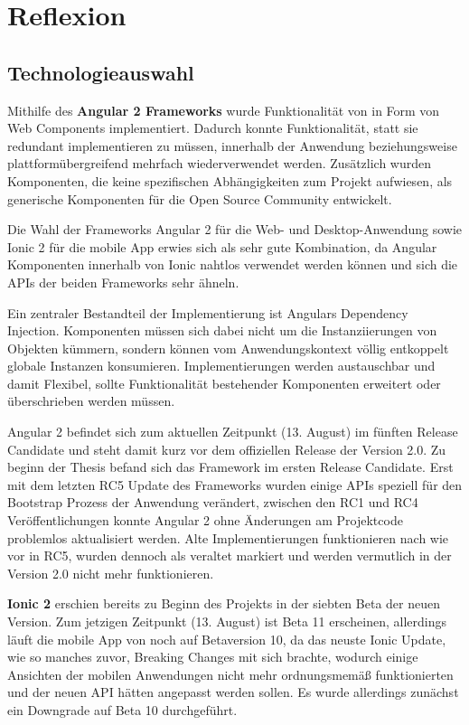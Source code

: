 
\chapter{Reflexion}

\label{chap:reflexion}

\section{Technologieauswahl}

Mithilfe des \textbf{Angular 2 Frameworks} wurde Funktionalität von \projectname{} in Form von
Web Components implementiert.
Dadurch konnte Funktionalität, statt sie redundant implementieren zu müssen, innerhalb der
Anwendung beziehungsweise plattformübergreifend mehrfach wiederverwendet werden.
Zusätzlich wurden Komponenten, die keine spezifischen Abhängigkeiten zum Projekt aufwiesen, als
generische Komponenten für die Open Source Community entwickelt.

Die Wahl der Frameworks Angular 2 für die Web- und Desktop-Anwendung sowie Ionic 2 für
die mobile App erwies sich als sehr gute Kombination,
da Angular Komponenten innerhalb von Ionic nahtlos verwendet werden können
und sich die APIs der beiden Frameworks sehr ähneln.

Ein zentraler Bestandteil der Implementierung ist Angulars Dependency Injection.
Komponenten müssen sich dabei nicht um die Instanziierungen von Objekten kümmern,
sondern können vom Anwendungskontext völlig entkoppelt globale Instanzen konsumieren.
Implementierungen werden austauschbar und damit Flexibel,
sollte Funktionalität bestehender Komponenten erweitert oder überschrieben werden müssen.

Angular 2 befindet sich zum aktuellen Zeitpunkt (13. August) im fünften Release Candidate und steht damit kurz
vor dem offiziellen Release der Version 2.0. Zu beginn der Thesis befand sich das Framework im ersten Release Candidate.
Erst mit dem letzten RC5 Update des Frameworks wurden einige APIs speziell für den Bootstrap Prozess der Anwendung verändert,
zwischen den RC1 und RC4 Veröffentlichungen konnte Angular 2 ohne Änderungen am Projektcode problemlos
aktualisiert werden. Alte Implementierungen funktionieren nach wie vor in RC5,
wurden dennoch als veraltet markiert und werden vermutlich in der Version 2.0 nicht mehr
funktionieren.


\textbf{Ionic 2} erschien bereits zu Beginn des Projekts in der siebten Beta der neuen Version.
Zum jetzigen Zeitpunkt (13. August) ist Beta 11 erscheinen, allerdings läuft die mobile App von
\projectname{} noch auf Betaversion 10, da das neuste Ionic Update,
wie so manches zuvor, Breaking Changes mit sich brachte, wodurch einige Ansichten der
mobilen Anwendungen nicht mehr ordnungsmemäß funktionierten und der neuen API hätten angepasst werden sollen.
Es wurde allerdings zunächst ein Downgrade auf Beta 10 durchgeführt.

